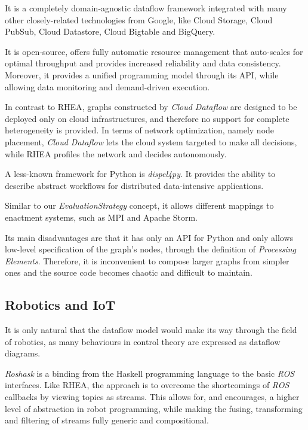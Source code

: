 \documentclass[sigplan,review,anonymous]{acmart}
\begin{document}
It is a completely domain-agnostic dataflow framework integrated with many other
closely-related technologies from Google, like Cloud Storage, Cloud PubSub,
Cloud Datastore, Cloud Bigtable and BigQuery.

It is open-source, offers fully automatic resource management that auto-scales
for optimal throughput and provides increased reliability and data consistency.
Moreover, it provides a unified programming model through its API, while
allowing data monitoring and demand-driven execution.

In contrast to \textsc{RHEA}, graphs constructed by \textit{Cloud Dataflow} are
designed to be deployed only on cloud infrastructures, and therefore no support
for complete heterogeneity is provided. In terms of network optimization, namely
node placement,  \textit{Cloud Dataflow} lets the cloud system targeted to make
all decisions, while \textsc{RHEA} profiles the network and decides
autonomously.

A less-known framework for Python is
\textit{dispel4py}. It provides the ability
to describe abstract workflows for distributed data-intensive applications.

Similar to our \textit{EvaluationStrategy} concept, it allows different mappings
to enactment systems, such as MPI and Apache
Storm.

Its main disadvantages are that it has only an API for Python and only allows
low-level specification of the graph's nodes, through the definition of
\textit{Processing Elements}. Therefore, it is inconvenient to compose larger
graphs from simpler ones and the source code becomes chaotic and difficult to
maintain.

\subsection{Robotics and IoT}

It is only natural that the dataflow model would make its way through the field
of robotics, as many behaviours in control theory are expressed as dataflow
diagrams.

\textit{Roshask}\cite{roshask} is a binding from the Haskell programming language
to the basic \textit{ROS} interfaces. Like \textsc{RHEA}, the approach is to
overcome the shortcomings of \textit{ROS} callbacks by viewing topics as
streams. This allows for, and encourages, a higher level of abstraction in
robot programming, while making the fusing, transforming and filtering of
streams fully generic and compositional.
\end{document}
